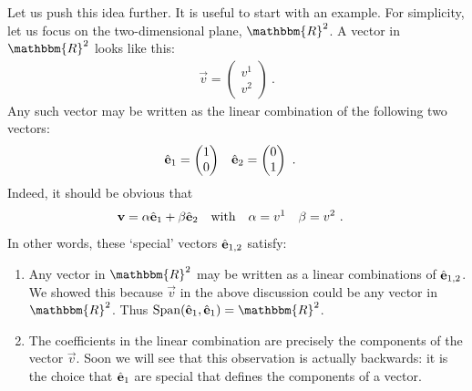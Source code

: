 \documentclass[12pt]{article}
\begin{document}
Let us push this idea further. It is useful to start with an example. For simplicity, let us focus on the two-dimensional plane, $\mathbbm{R}^2$. A vector in $\mathbbm{R}^2$ looks like this:
\begin{align}
    \vec{v} =
    \begin{pmatrix}
        v^1 \\ v^2
    \end{pmatrix} \ .
    \label{eq:v:v1:v2}
\end{align}
Any such vector may be written as the linear combination of the following two vectors:
\begin{align}
    {\hat{\mathbf{e}}}_1 &=
    \begin{pmatrix}
        1 \\ 0
    \end{pmatrix}
    &
    {\hat{\mathbf{e}}}_2 &=
    \begin{pmatrix}
        0 \\ 1
    \end{pmatrix} \ .
\end{align}
Indeed, it should be obvious that 
\begin{align}
    \mathbf{v} &= \alpha {\hat{\mathbf{e}}}_1 + \beta {\hat{\mathbf{e}}}_2
    & \textnormal{with}&
    &\alpha &= v^1
    &\beta &= v^2 \ .
    \label{eq:natural:cartesian:basis}
\end{align}
In other words, these `special' vectors ${\hat{\mathbf{e}}}_{1,2}$ satisfy:
\begin{enumerate}
    \item Any vector in $\mathbbm{R}^2$ may be written as a linear combinations of ${\hat{\mathbf{e}}}_{1,2}$. We showed this because $\vec{v}$ in the above discussion could be any vector in $\mathbbm{R}^2$. Thus $\text{Span}({\bas{e}}_{1},{\bas{e}}_{1})=\mathbbm{R}^2$.
    \item The coefficients in the linear combination are precisely the components of the vector $\vec{v}$. Soon we will see that this observation is actually backwards: it is the choice that ${\hat{\mathbf{e}}}_{1}$ are special that defines the components of a vector.
\end{enumerate}
\end{document}
